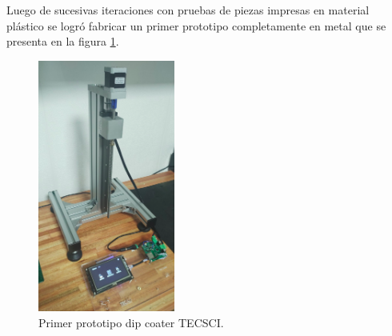 
Luego de sucesivas iteraciones con pruebas de piezas impresas en material plástico se logró fabricar un primer prototipo completamente en metal que se presenta en la figura \ref{fig:mecanica_real_model}.

\begin{figure}[h]
	\centering
	\includegraphics[width=0.4\textwidth]{./Figures/real.png}
	\caption{Primer prototipo dip coater TECSCI.}
	\label{fig:mecanica_real_model}
\end{figure}

